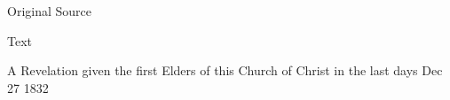 			\begin{description}
				\item[Original Source]
			\end{description}
			
			
			\begin{description}
				\item[Text]
			\end{description}
				
				\begin{tightcenter}
					A Revelation given the first Elders of this Church of Christ in the last days Dec 27 1832
				\end{tightcenter}
				
